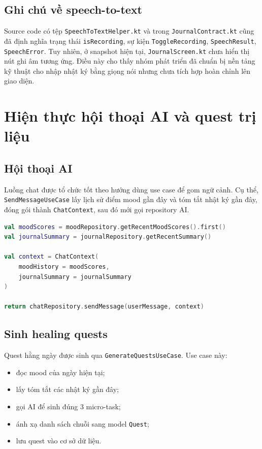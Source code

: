 \documentclass{zenbuddy-report}
\begin{document}

\subsection{Ghi chú về speech-to-text}
Source code có tệp \texttt{SpeechToTextHelper.kt} và trong \texttt{JournalContract.kt} cũng đã định nghĩa trạng thái \texttt{isRecording}, sự kiện \texttt{ToggleRecording}, \texttt{SpeechResult}, \texttt{SpeechError}. Tuy nhiên, ở snapshot hiện tại, \texttt{JournalScreen.kt} chưa hiển thị nút ghi âm tương ứng. Điều này cho thấy nhóm phát triển đã chuẩn bị nền tảng kỹ thuật cho nhập nhật ký bằng giọng nói nhưng chưa tích hợp hoàn chỉnh lên giao diện.

\section{Hiện thực hội thoại AI và quest trị liệu}
\subsection{Hội thoại AI}
Luồng chat được tổ chức tốt theo hướng dùng use case để gom ngữ cảnh. Cụ thể, \texttt{SendMessageUseCase} lấy lịch sử điểm mood gần đây và tóm tắt nhật ký gần đây, đóng gói thành \texttt{ChatContext}, sau đó mới gọi repository AI.

\begin{lstlisting}[language=Kotlin,caption={Pseudocode use case gửi tin nhắn có ngữ cảnh},label={lst:send-message-usecase}]
val moodScores = moodRepository.getRecentMoodScores().first()
val journalSummary = journalRepository.getRecentSummary()

val context = ChatContext(
    moodHistory = moodScores,
    journalSummary = journalSummary
)

return chatRepository.sendMessage(userMessage, context)
\end{lstlisting}


\subsection{Sinh healing quests}
Quest hằng ngày được sinh qua \texttt{GenerateQuestsUseCase}. Use case này:
\begin{itemize}
  \item đọc mood của ngày hiện tại;
  \item lấy tóm tắt các nhật ký gần đây;
  \item gọi AI để sinh đúng 3 micro-task;
  \item ánh xạ danh sách chuỗi sang model \texttt{Quest};
  \item lưu quest vào cơ sở dữ liệu.
\end{itemize}
\end{document}
